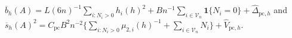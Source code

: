 \(\overline b_h(A)=L(6n)^{-1}\sum_{i:N_i>0}h_i(h)^2+B n^{-1}\sum_{i\in\mathcal V_n}\mathbf 1\{N_i=0\}+\widehat\Delta_{\mathrm{pc},h}\) and \(\overline s_h(A)^2=C_{\mathrm{pc}}B^2n^{-2}\{\sum_{i:N_i>0}\mu_{2,i}(h)^{-1}+\sum_{i\in\mathcal V_n}N_i\}+\widehat V_{\mathrm{pc},h}\).